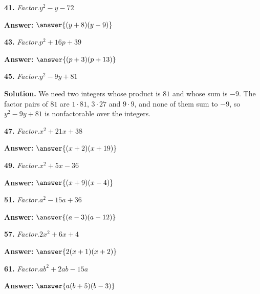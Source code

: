 \documentclass{ximera}
\begin{document}
\begin{problem}
\textbf{41.} \emph{Factor.}\quad $y^2 - y - 72$

\textbf{Answer:} $\answer{(y +8)(y -9)}$
\end{problem}

\begin{problem}
\textbf{43.} \emph{Factor.}\quad $p^2 + 16p + 39$

\textbf{Answer:} $\answer{(p +3)(p +13)}$
\end{problem}

\begin{problem}
\textbf{45.} \emph{Factor.}\quad $y^2 - 9y + 81$

\begin{multipleChoice}
\end{multipleChoice}

\begin{hint}
\textbf{Solution.} We need two integers whose product is $81$ and whose sum is $-9$. The factor pairs of $81$ are $1\cdot 81$, $3\cdot 27$ and $9\cdot 9$, and none of them sum to $-9$, so $y^2-9y+81$ is nonfactorable over the integers.
\end{hint}
\end{problem}

\begin{problem}
\textbf{47.} \emph{Factor.}\quad $x^2 + 21x + 38$

\textbf{Answer:} $\answer{(x +2)(x +19)}$
\end{problem}

\begin{problem}
\textbf{49.} \emph{Factor.}\quad $x^2 + 5x - 36$

\textbf{Answer:} $\answer{(x +9)(x -4)}$
\end{problem}

\begin{problem}
\textbf{51.} \emph{Factor.}\quad $a^2 - 15a + 36$

\textbf{Answer:} $\answer{(a -3)(a -12)}$
\end{problem}

\begin{problem}
\textbf{57.} \emph{Factor.}\quad $2x^2 + 6x + 4$

\textbf{Answer:} $\answer{2(x +1)(x +2)}$
\end{problem}

\begin{problem}
\textbf{61.} \emph{Factor.}\quad $ab^2 + 2ab - 15a$

\textbf{Answer:} $\answer{a(b +5)(b -3)}$
\end{problem}
\end{document}
